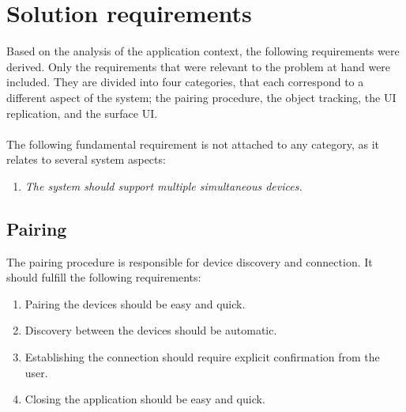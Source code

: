 \section{Solution requirements}
\label{sec:requirements}

Based on the analysis of the application context, the following requirements were derived.
Only the requirements that were relevant to the problem at hand were included.
They are divided into four categories, that each correspond to a different aspect of the system; the pairing procedure, the object tracking, the UI replication, and the surface UI.
\hfill\\
\hfill\\
The following fundamental requirement is not attached to any category, as it relates to several system aspects:
\begin{enumerate}[{R}-1]
\item \emph{The system should support multiple simultaneous devices.}
\end{enumerate}

\subsection{Pairing}

The pairing procedure is responsible for device discovery and connection.
It should fulfill the following requirements:

\label{RA}
\begin{enumerate}[{RA}-1]
\item Pairing the devices should be easy and quick.
\item Discovery between the devices should be automatic.
\item Establishing the connection should require explicit confirmation from the user.
\item Closing the application should be easy and quick.
\end{enumerate}


